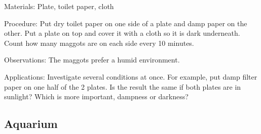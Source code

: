 \begin{multicols}{2}
\begin{description*}
\item[Materials:]{Plate, toilet paper, cloth}
\item[Procedure:]{Put dry toilet paper on one side of
a plate and damp paper on the
other. Put a plate on top and
cover it with a cloth so it is dark
underneath. Count how many
maggots are on each side every
10 minutes.}
\item[Observations:]{The maggots prefer a humid environment.}
\item[Applications:]{Investigate several conditions at
once. For example, put damp
filter paper on one half of the 2
plates. Is the result the same if
both plates are in sunlight? Which
is more important, dampness or
darkness?}
\end{description*}

%
%

\subsection{Aquarium}  %


\end{multicols}

